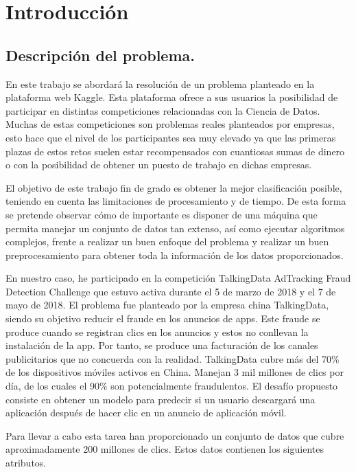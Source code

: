 \chapter[Introducción]{Introducción}
\section{Descripción del problema.}
En este trabajo se abordará la resolución de un problema planteado en la plataforma web Kaggle. Esta plataforma ofrece a sus usuarios la posibilidad de participar en distintas competiciones relacionadas con la Ciencia de Datos. Muchas de estas competiciones son problemas reales planteados por empresas, esto hace que el nivel de los participantes sea muy elevado ya que las primeras plazas de estos retos suelen estar recompensados con cuantiosas sumas de dinero o con la posibilidad de obtener un puesto de trabajo en dichas empresas.

El objetivo de este trabajo fin de grado es obtener la mejor clasificación posible, teniendo en cuenta las limitaciones de procesamiento y de tiempo. De esta forma se pretende observar cómo de importante es disponer de una máquina que permita manejar un conjunto de datos tan extenso, así como ejecutar algoritmos complejos, frente a realizar un buen enfoque del problema y realizar un buen preprocesamiento para obtener toda la información de los datos proporcionados.

En nuestro caso, he participado en la competición TalkingData AdTracking Fraud Detection Challenge que estuvo activa durante el 5 de marzo de 2018 y el 7 de mayo de 2018. El problema fue planteado por la empresa china TalkingData, siendo su objetivo reducir el fraude en los anuncios de apps. Este fraude se produce cuando se registran clics en los anuncios y estos no conllevan la instalación de la app. Por tanto, se produce una facturación de los canales publicitarios que no concuerda con la realidad.
TalkingData	cubre más del 70\% de los dispositivos móviles activos en China. Manejan 3 mil millones de clics por día, de los cuales el 90\% son potencialmente fraudulentos.  El desafío propuesto consiste en obtener un modelo para predecir si un usuario descargará una aplicación después de hacer clic en un anuncio de aplicación móvil.

Para llevar a cabo esta tarea han proporcionado un conjunto de datos que cubre aproximadamente 200 millones de clics. Estos datos contienen los siguientes atributos.

